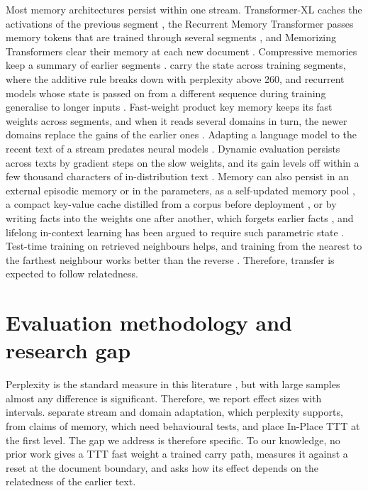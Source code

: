 \documentclass[12pt,a4paper]{report}
\begin{document}
Most memory architectures persist within one stream. Transformer-XL caches the activations of the previous segment \citep{dai2019transformerxl}, the Recurrent Memory Transformer passes memory tokens that are trained through several segments \citep{bulatov2022rmt}, and Memorizing Transformers clear their memory at each new document \citep{wu2022memorizing}. Compressive memories keep a summary of earlier segments \citep{rae2019compressive,munkhdalai2024leave}. \citet{schlag2021linear} carry the state across training segments, where the additive rule breaks down with perplexity above 260, and recurrent models whose state is passed on from a different sequence during training generalise to longer inputs \citep{buitrago2025understanding}. Fast-weight product key memory keeps its fast weights across segments, and when it reads several domains in turn, the newer domains replace the gains of the earlier ones \citep{zhao2026fwpkm}. Adapting a language model to the recent text of a stream predates neural models \citep{kneser1993dynamic}. Dynamic evaluation persists across texts by gradient steps on the slow weights, and its gain levels off within a few thousand characters of in-distribution text \citep{krause2018dynamic}. Memory can also persist in an external episodic memory \citep{das2024larimar} or in the parameters, as a self-updated memory pool \citep{wang2024memoryllm}, a compact key-value cache distilled from a corpus before deployment \citep{eyuboglu2025cartridges}, or by writing facts into the weights one after another, which forgets earlier facts \citep{oneill2026continually}, and lifelong in-context learning has been argued to require such parametric state \citep{mcdermott2026lifelong}. Test-time training on retrieved neighbours helps, and training from the nearest to the farthest neighbour works better than the reverse \citep{hardt2024test}. Therefore, transfer is expected to follow relatedness.

\section{Evaluation methodology and research gap}

Perplexity is the standard measure in this literature \citep{meister2021beyond}, but with large samples almost any difference is significant. Therefore, we report effect sizes with intervals. \citet{song2026beyond} separate stream and domain adaptation, which perplexity supports, from claims of memory, which need behavioural tests, and place In-Place TTT at the first level. The gap we address is therefore specific. To our knowledge, no prior work gives a TTT fast weight a trained carry path, measures it against a reset at the document boundary, and asks how its effect depends on the relatedness of the earlier text.
\end{document}
